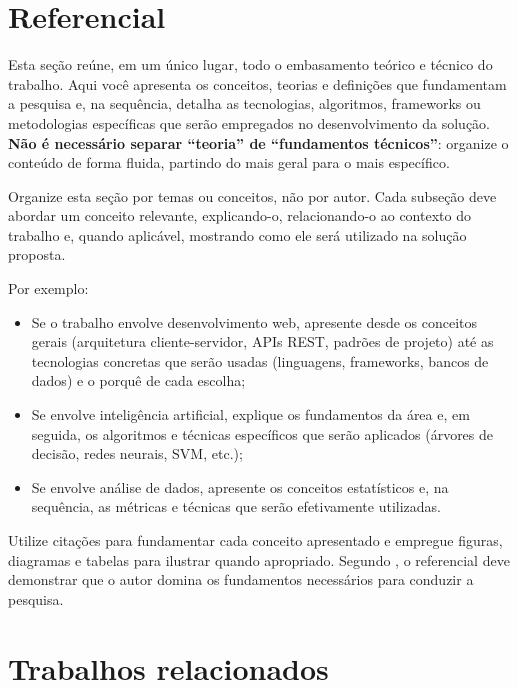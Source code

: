 \documentclass[
    12pt,                %
    openright,           %
    oneside,             %
    a4paper,             %
    english,             %
    brazil               %
]{abntex2}
\begin{document}
\section{Referencial}
\label{sec:referencial}

Esta seção reúne, em um único lugar, todo o embasamento teórico e técnico do trabalho. Aqui você apresenta os conceitos, teorias e definições que fundamentam a pesquisa e, na sequência, detalha as tecnologias, algoritmos, frameworks ou metodologias específicas que serão empregados no desenvolvimento da solução. \textbf{Não é necessário separar ``teoria'' de ``fundamentos técnicos''}: organize o conteúdo de forma fluida, partindo do mais geral para o mais específico.

Organize esta seção por temas ou conceitos, não por autor. Cada subseção deve abordar um conceito relevante, explicando-o, relacionando-o ao contexto do trabalho e, quando aplicável, mostrando como ele será utilizado na solução proposta.

Por exemplo:
\begin{itemize}
    \item Se o trabalho envolve desenvolvimento web, apresente desde os conceitos gerais (arquitetura cliente-servidor, APIs REST, padrões de projeto) até as tecnologias concretas que serão usadas (linguagens, frameworks, bancos de dados) e o porquê de cada escolha;
    \item Se envolve inteligência artificial, explique os fundamentos da área e, em seguida, os algoritmos e técnicas específicos que serão aplicados (árvores de decisão, redes neurais, SVM, etc.);
    \item Se envolve análise de dados, apresente os conceitos estatísticos e, na sequência, as métricas e técnicas que serão efetivamente utilizadas.
\end{itemize}

Utilize citações para fundamentar cada conceito apresentado e empregue figuras, diagramas e tabelas para ilustrar quando apropriado. Segundo , o referencial deve demonstrar que o autor domina os fundamentos necessários para conduzir a pesquisa.

\section{Trabalhos relacionados}
\label{sec:trabalhos_relacionados}
\end{document}
